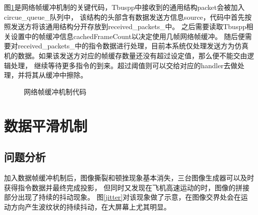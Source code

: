 \par
图\ref{framebuf}是网络帧缓冲机制的关键代码，Tbuspp中接收到的通用结构packet会被加入circue\_queue\_队列中，
该结构的头部含有数据发送方信息source，代码中首先按照发送方将该通用结构分开存放到received\_packets\_中。
之后需要读取Tbuspp相关设置中的帧缓冲信息cachedFrameCount以决定使用几帧网络帧缓冲。
随后便需要对received\_packets\_中的指令数据进行处理，目前本系统仅处理发送方为仿真机的数据。如果该发送方对应的帧缓存数量还没有超过设定值，那么便不能交由逻辑处理，
继续等待更多指令的到来。超过阈值则可以交给对应的handler去做处理，并将其从缓冲中擦除。
\clearpage  
\begin{figure}[h!]
    \centering
     
    \caption{网络帧缓冲机制代码}
    \label{framebuf}
\end{figure}

\section{数据平滑机制}
\subsection{问题分析}
加入数据帧缓冲机制后，图像撕裂和顿挫现象基本消失，三台图像生成器可以及时获得指令数据并最终完成投影，
但同时又发现在飞机高速运动的时，图像的拼接部分出现了持续的抖动现象。
图\ref{jitter}对该现象做了示意，在图像交界处会在运动方向产生波纹状的持续抖动，在大屏幕上尤其明显。

